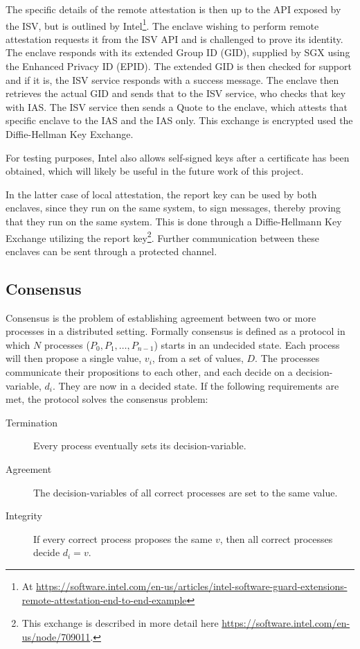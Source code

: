 \documentclass[12pt]{article}
\begin{document}
			The specific details of the remote attestation is then up to the API exposed by the ISV, but is outlined by Intel\footnote{At \url{https://software.intel.com/en-us/articles/intel-software-guard-extensions-remote-attestation-end-to-end-example}}.
			The enclave wishing to perform remote attestation requests it from the ISV API and is challenged to prove its identity.
			The enclave responds with its extended Group ID (GID), supplied by SGX using the Enhanced Privacy ID (EPID).
			The extended GID is then checked for support and if it is, the ISV service responds with a success message.
			The enclave then retrieves the actual GID and sends that to the ISV service, who checks that key with IAS.
			The ISV service then sends a Quote to the enclave, which attests that specific enclave to the IAS and the IAS only.
			This exchange is encrypted used the Diffie-Hellman Key Exchange. 

			For testing purposes, Intel also allows self-signed keys after a certificate has been obtained, which will likely be useful in the future work of this project.

			In the latter case of local attestation, the report key can be used by both enclaves, since they run on the same system, to sign messages, thereby proving that they run on the same system.
			This is done through a Diffie-Hellmann Key Exchange utilizing the report key\footnote{This exchange is described in more detail here \url{https://software.intel.com/en-us/node/709011}.}.
			Further communication between these enclaves can be sent through a protected channel.

		\subsection{Consensus}
		Consensus is the problem of establishing agreement between two or more processes in a distributed setting. Formally consensus is defined as a protocol in which $N$ processes ($P_0, P_1, \dots, P_{n-1}$) starts in an undecided state. Each process will then propose a single value, $v_i$, from a set of values, $D$. The processes communicate their propositions to each other, and each decide on a decision-variable, $d_i$. They are now in a decided state. If the following requirements are met, the protocol solves the consensus problem:
		\begin{description}
			\item[Termination] Every process eventually sets its decision-variable. 
			\item[Agreement] The decision-variables of all correct processes are set to the same value.
			\item[Integrity] If every correct process proposes the same $v$, then all correct processes decide $d_i = v$.
		\end{description}
\end{document}

